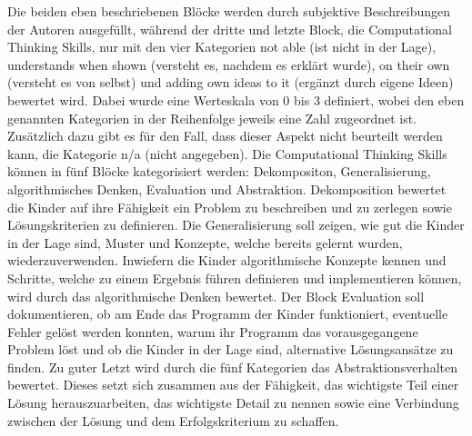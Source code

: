 	Die beiden eben beschriebenen Blöcke werden durch subjektive Beschreibungen der Autoren ausgefüllt, während der dritte und letzte Block, die Computational Thinking Skills, nur mit den vier Kategorien not able (ist nicht in der Lage), understands when shown (versteht es, nachdem es erklärt wurde), on their own (versteht es von selbst) und adding own ideas to it (ergänzt durch eigene Ideen) bewertet wird. Dabei wurde eine Werteskala von 0 bis 3 definiert, wobei den eben genannten Kategorien in der Reihenfolge jeweils eine Zahl zugeordnet ist. Zusätzlich dazu gibt es für den Fall, dass dieser Aspekt nicht beurteilt werden kann, die Kategorie  n/a (nicht angegeben). Die Computational Thinking Skills können in fünf Blöcke kategorisiert werden: Dekompositon, Generalisierung, algorithmisches Denken, Evaluation und Abstraktion. Dekomposition bewertet die Kinder auf ihre Fähigkeit ein Problem zu beschreiben und zu zerlegen sowie Lösungskriterien zu definieren. Die Generalisierung soll zeigen, wie gut die Kinder in der Lage sind, Muster und Konzepte, welche bereits gelernt wurden, wiederzuverwenden. Inwiefern die Kinder algorithmische Konzepte kennen und Schritte, welche zu einem Ergebnis führen definieren und implementieren können, wird durch das algorithmische Denken bewertet. Der Block Evaluation soll dokumentieren, ob am Ende das Programm der Kinder funktioniert, eventuelle Fehler gelöst werden konnten, warum ihr Programm das vorausgegangene Problem löst und ob die Kinder in der Lage sind, alternative Lösungsansätze zu finden. Zu guter Letzt wird durch die fünf Kategorien das Abstraktionsverhalten bewertet. Dieses setzt sich zusammen aus der Fähigkeit, das wichtigste Teil einer Lösung herauszuarbeiten, das wichtigste Detail zu nennen sowie eine Verbindung zwischen der Lösung und dem Erfolgskriterium zu schaffen.
 
